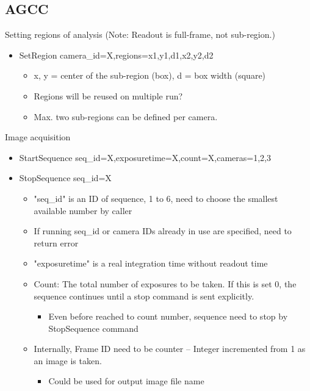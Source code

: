 \documentclass[a4paper,notitlepage]{article}
\begin{document}
\subsection{AGCC}

Setting regions of analysis (Note: Readout is full-frame, not sub-region.)

\begin{itemize}
  \item SetRegion camera\_id=X,regions=x1,y1,d1,x2,y2,d2
  \begin{itemize}
    \item x, y = center of the sub-region (box), d = box width (square)
    \item Regions will be reused on multiple run?
    \item Max. two sub-regions can be defined per camera.
  \end{itemize}
\end{itemize}

Image acquisition
\begin{itemize}
  \item StartSequence seq\_id=X,exposuretime=X,count=X,cameras=1,2,3
  \item StopSequence seq\_id=X
  \begin{itemize}
    \item "seq\_id" is an ID of sequence, 1 to 6, need to choose the smallest available number by caller 
    \item If running seq\_id or camera IDs already in use are specified, need to return error
    \item "exposuretime" is a real integration time without readout time
    \item Count: The total number of exposures to be taken. If this is set 0, the sequence continues until a stop command is sent explicitly.
    \begin{itemize}
      \item Even before reached to count number, sequence need to stop by StopSequence command
    \end{itemize}
    \item Internally, Frame ID need to be counter -- Integer incremented from 1 as an image is taken.
    \begin{itemize}
      \item Could be used for output image file name
    \end{itemize}
  \end{itemize}
\end{itemize}
\end{document}
